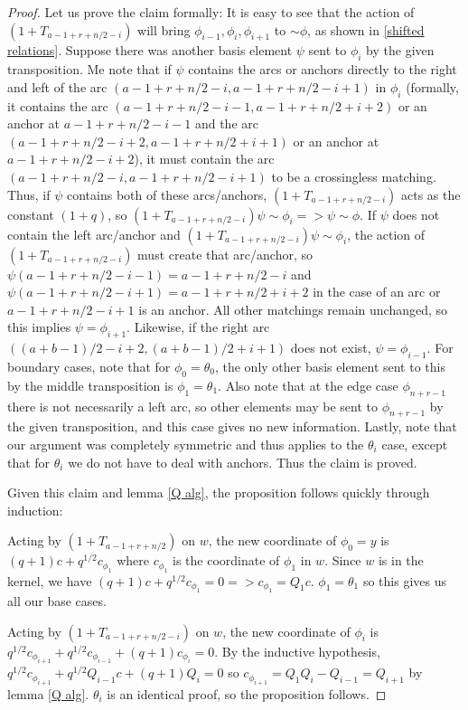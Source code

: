 \documentclass{amsart}
\begin{document}
\begin{proof}
	Let us prove the claim formally: It is easy to see that the action of $(1+T_{a-1+r+n/2-i})$ will bring $\phi_{i-1},\phi_i,\phi_{i+1}$ to $\sim \phi$, as shown in \ref{shifted relations}. Suppose there was another basis element $\psi$ sent to $\phi_i$ by the given transposition. Me note that if $\psi$ contains the arcs or anchors directly to the right and left of the arc $(a-1+r+n/2-i,a-1+r+n/2-i+1)$ in $\phi_i$ (formally, it contains the arc $(a-1+r+n/2-i-1,a-1+r+n/2+i+2)$ or an anchor at $a-1+r+n/2-i-1$ and the arc $(a-1+r+n/2-i+2,a-1+r+n/2+i+1)$ or an anchor at $a-1+r+n/2-i+2$), it must contain the arc $(a-1+r+n/2-i,a-1+r+n/2-i+1)$ to be a crossingless matching. Thus, if $\psi$ contains both of these arcs/anchors, $(1+T_{a-1+r+n/2-i})$ acts as the constant $(1+q)$, so $(1+T_{a-1+r+n/2-i})\psi\sim \phi_i=>\psi\sim \phi$. If $\psi$ does not contain the left arc/anchor and $(1+T_{a-1+r+n/2-i})\psi\sim \phi_i$, the action of $(1+T_{a-1+r+n/2-i})$ must create that arc/anchor, so $\psi(a-1+r+n/2-i-1)=a-1+r+n/2-i$ and $\psi(a-1+r+n/2-i+1)=a-1+r+n/2+i+2$ in the case of an arc or $a-1+r+n/2-i+1$ is an anchor. All other matchings remain unchanged, so this implies $\psi=\phi_{i+1}$. Likewise, if the right arc $((a+b-1)/2-i+2,(a+b-1)/2+i+1)$ does not exist, $\psi=\phi_{i-1}$. For boundary cases, note that for $\phi_0=\theta_0$, the only other basis element sent to this by the middle transposition is $\phi_1=\theta_1$. Also note that at the edge case $\phi_{n+r-1}$ there is not necessarily a left arc, so other elements may be sent to $\phi_{n+r-1}$ by the given transposition, and this case gives no new information. Lastly, note that our argument was completely symmetric and thus applies to the $\theta_i$ case, except that for $\theta_i$ we do not have to deal with anchors. Thus the claim is proved.
	
	Given this claim and lemma \ref{Q alg}, the proposition follows quickly through induction: 
	
	Acting by $(1+T_{a-1+r+n/2})$ on $w$, the new coordinate of $\phi_0=y$ is $(q+1)c+q^{1/2}c_{\phi_1}$ where $c_{\phi_1}$ is the coordinate of $\phi_1$ in $w$. Since $w$ is in the kernel, we have $(q+1)c+q^{1/2}c_{\phi_1}=0=>c_{\phi_1}=Q_1c$. $\phi_1=\theta_1$ so this gives us all our base cases.
	
	Acting by $(1+T_{a-1+r+n/2-i})$ on $w$, the new coordinate of $\phi_i$ is $q^{1/2}c_{\phi_{i+1}}+q^{1/2}c_{\phi_{i-1}}+(q+1)c_{\phi_{i}}=0$. By the inductive hypothesis, $q^{1/2}c_{\phi_{i+1}}+q^{1/2}Q_{i-1}c+(q+1)Q_i=0$ so $c_{\phi_{i+1}}=Q_1Q_i-Q_{i-1}=Q_{i+1}$ by lemma \ref{Q alg}. $\theta_i$ is an identical proof, so the proposition follows. 
	

\end{proof}
\end{document}
